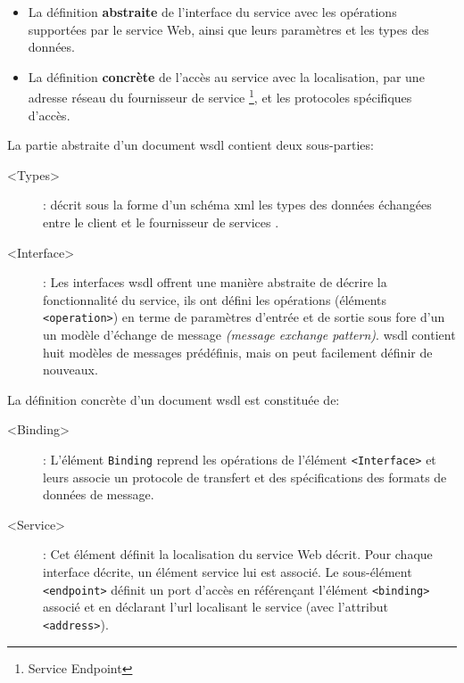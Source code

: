   \SpecialItem
  \begin{itemize}
  \item La définition \textbf{abstraite} de l'interface du service
    avec les opérations supportées par le service Web, ainsi que leurs
    paramètres et les types des données.

  \item La définition \textbf{concrète} de l'accès au service avec la
    localisation, par une adresse réseau du fournisseur de service
    \footnote{Service Endpoint}, et les protocoles spécifiques
    d'accès.
  \end{itemize}
  \enddescription

  La partie abstraite d'un document \acrshort{wsdl} contient deux
  sous-parties:

  \SpecialItem
  \renewcommand{\descriptionlabel}[1]{\hspace{1cm}\texttt{#1}}
  \begin{description}
  \item[<Types>]: décrit sous la forme d'un schéma \acrshort{xml} les
    types des données échangées entre le client et le fournisseur de
    services \cite{part20012}.

  \item[<Interface>]: Les interfaces \acrshort{wsdl} offrent une
    manière abstraite de décrire la fonctionnalité du service, ils ont
    défini les opérations (éléments \texttt{<operation>}) en terme de
    paramètres d'entrée et de sortie sous fore d'un un modèle
    d'échange de message \textit{(message exchange
      pattern)}. \acrshort{wsdl} contient huit modèles de messages
    prédéfinis, mais on peut facilement définir de nouveaux.
  \end{description}
  \enddescription

  La définition concrète d'un document \acrshort{wsdl} est constituée
  de:

  \SpecialItem
  \renewcommand{\descriptionlabel}[1]{\hspace{1cm}\texttt{#1}}
  \begin{description}
  \item[<Binding>]: L'élément \texttt{Binding} reprend les opérations
    de l'élément \texttt{<Interface>} et leurs associe un protocole de
    transfert et des spécifications des formats de données de message.

  \item[<Service>]: Cet élément définit la localisation du service Web
    décrit. Pour chaque interface décrite, un élément service lui est
    associé. Le sous-élément \texttt{<endpoint>} définit un port
    d’accès en référençant l'élément \texttt{<binding>} associé et en
    déclarant l'\acrshort{url} localisant le service (avec l'attribut
    \texttt{<address>}).
  \end{description}

